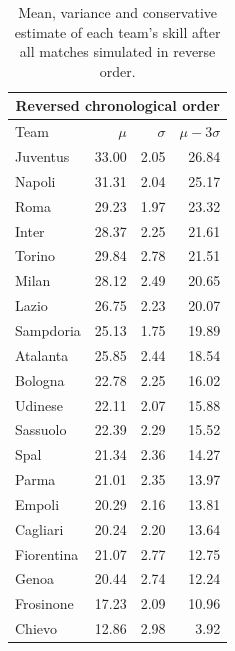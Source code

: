 \documentclass{article}
\begin{document}
	\begin{table}[!h]
		\caption{Mean, variance and conservative estimate of each team's skill after all matches simulated in reverse order.}
		\label{tab:q4_rev}
		\centering
		\footnotesize
		\begin{tabular}{lrrr}
			\toprule
			\multicolumn{4}{c}{Reversed chronological order} \\
			\midrule
			Team     		& $ \mu $ & $ \sigma $ & $ \mu - 3\sigma $\\
			\midrule
			Juventus    &  33.00  &  2.05  &  26.84\\
			Napoli      &  31.31  &  2.04  &  25.17\\
			Roma        &  29.23  &  1.97  &  23.32\\
			Inter       &  28.37  &  2.25  &  21.61\\
			Torino      &  29.84  &  2.78  &  21.51\\
			Milan       &  28.12  &  2.49  &  20.65\\
			Lazio       &  26.75  &  2.23  &  20.07\\
			Sampdoria   &  25.13  &  1.75  &  19.89\\
			Atalanta    &  25.85  &  2.44  &  18.54\\
			Bologna     &  22.78  &  2.25  &  16.02\\
			Udinese     &  22.11  &  2.07  &  15.88\\
			Sassuolo    &  22.39  &  2.29  &  15.52\\
			Spal        &  21.34  &  2.36  &  14.27\\
			Parma       &  21.01  &  2.35  &  13.97\\
			Empoli      &  20.29  &  2.16  &  13.81\\
			Cagliari    &  20.24  &  2.20  &  13.64\\
			Fiorentina  &  21.07  &  2.77  &  12.75\\
			Genoa       &  20.44  &  2.74  &  12.24\\
			Frosinone   &  17.23  &  2.09  &  10.96\\
			Chievo      &  12.86  &  2.98  &   3.92\\\bottomrule
		\end{tabular}
	\end{table}
	
\end{document}
